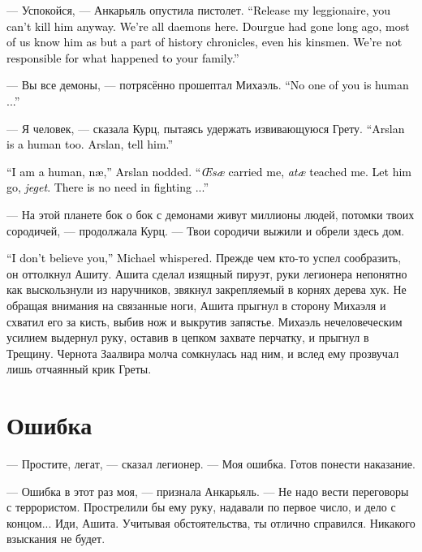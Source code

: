 \documentclass[a4paper,10pt,fleqn]{book}\usepackage{polyglossia}\setdefaultlanguage{english}\setotherlanguage{russian}\defaultfontfeatures{Ligatures=TeX,Mapping=tex-text}\usepackage{xcolor}\definecolor{lightgray}{HTML}{bbbbbb}\color{lightgray}\newcommand{\ml}[3]{\textcolor{black}{#3}}
\begin{document}
--- Успокойся, --- Анкарьяль опустила пистолет.
\ml{$0$}
{--- Отпусти моего легионера, ты всё равно не сможешь его убить.}
{``Release my leggionaire, you can't kill him anyway.}
\ml{$0$}
{Мы все здесь демоны.}
{We're all daemons here.}
\ml{$0$}
{Дорге давно уже нет в живых, многие из нас знают о нём лишь из исторических хроник, даже члены его клана.}
{Dourgue had gone long ago, most of us know him as but a part of history chronicles, even his kinsmen.}
\ml{$0$}
{Мы не виноваты в том, что случилось с твоей семьёй.}
{We're not responsible for what happened to your family.''}

--- Вы все демоны, --- потрясённо прошептал Михаэль.
\ml{$0$}
{--- Никто из вас не человек...}
{``No one of you is human ...''}

--- Я человек, --- сказала Курц, пытаясь удержать извивающуюся Грету.
\ml{$0$}
{--- Арслан --- тоже человек.}
{``Arslan is a human too.}
\ml{$0$}
{Арслан, скажи ему.}
{Arslan, tell him.''}

\ml{$0$}
{--- Я человек, нэй, --- закивал Арслан.}
{``I am a human, n\ae{},'' Arslan nodded.}
\ml{$0$}
{--- Меня эсей выносила, атай воспитал.}
{``\textit{\OE{}s\ae{}} carried me, \textit{at\ae{}} teached me.}
\ml{$0$}
{Отпусти его, егет.}
{Let him go, \textit{jeget}.}
\ml{$0$}
{Не надо драться...}
{There is no need in fighting ...''}

--- На этой планете бок о бок с демонами живут миллионы людей, потомки твоих сородичей, --- продолжала Курц.
--- Твои сородичи выжили и обрели здесь дом.

\ml{$0$}
{--- Я тебе не верю, --- прошептал Михаэль.}
{``I don't believe you,'' Michael whispered.}
Прежде чем кто-то успел сообразить, он оттолкнул Ашиту.
Ашита сделал изящный пируэт, руки легионера непонятно как выскользнули из наручников, звякнул закрепляемый в корнях дерева хук.
Не обращая внимания на связанные ноги, Ашита прыгнул в сторону Михаэля и схватил его за кисть, выбив нож и выкрутив запястье.
Михаэль нечеловеческим усилием выдернул руку, оставив в цепком захвате перчатку, и прыгнул в Трещину.
Чернота Заалвира молча сомкнулась над ним, и вслед ему прозвучал лишь отчаянный крик Греты.

\section{Ошибка}

--- Простите, легат, --- сказал легионер.
--- Моя ошибка.
Готов понести наказание.

--- Ошибка в этот раз моя, --- признала Анкарьяль.
--- Не надо вести переговоры с террористом.
Прострелили бы ему руку, надавали по первое число, и дело с концом...
Иди, Ашита.
Учитывая обстоятельства, ты отлично справился.
Никакого взыскания не будет.
\end{document}
